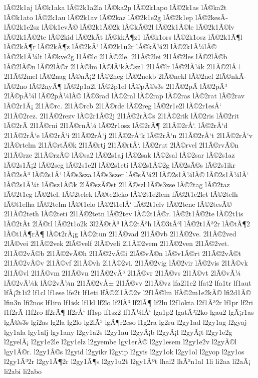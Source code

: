 {lÃ©2k1aj
lÃ©k1aka
lÃ©2k1a2la
lÃ©ka2p
lÃ©2k1apo
lÃ©2k1as
lÃ©ka2t
lÃ©k1ato
lÃ©2k1au
lÃ©2k1av
lÃ©2kaz
lÃ©2k1e2g
lÃ©2k1ep
lÃ©2kesÃ­
lÃ©2k1e2sz
lÃ©k1evÃ©
lÃ©2k1Ã©2k
lÃ©kÃ©2l
lÃ©2k1Ã©le
lÃ©2k1Ã©lv
lÃ©2k1Ã©2te
lÃ©2kid
lÃ©2kÃ­t
lÃ©kkÃ¶z1
lÃ©k1ors
lÃ©2k1osz
lÃ©2k1Ã¶l
lÃ©2kÃ¶r
lÃ©2kÃ¶z
lÃ©2kÅ‘
lÃ©2k1u2r
lÃ©kÃ¼2l
lÃ©2k1Ã¼lÃ©
lÃ©2k1Ã¼lt
lÃ©kve2g
l1Ã©lc
2l1Ã©2le.
2l1Ã©2lei
2l1Ã©2les
lÃ©2lÃ©b
lÃ©2lÃ©n
lÃ©2lÃ©r
2l1Ã©lm
lÃ©lÅ‘kÃ©sz1
2l1Ã©lr
lÃ©2lÃ¼k
2l1Ã©2lÅ±
2l1Ã©2mel
lÃ©2nag
lÃ©nÃ¡2
lÃ©2neg
lÃ©2nekb
2lÃ©nekl
lÃ©2nel
2lÃ©nkÃ­
lÃ©2no
lÃ©2nyÃ¶
lÃ©2p1a2l
lÃ©2p1el
lÃ©pÃ©s3s
2l1Ã©2pÃ­
lÃ©2pÃ³
2lÃ©pÃ¼l
lÃ©2pÃ¼lÃ©
lÃ©3rad
lÃ©2ral
lÃ©2rap
lÃ©2ras
lÃ©2rat
lÃ©2rav
lÃ©2r1Ã¡
2l1Ã©rc.
2l1Ã©rcb
2l1Ã©rde
lÃ©2reg
lÃ©2r1e2l
lÃ©2r1esÅ‘
2l1Ã©2rez.
2l1Ã©2rezv
lÃ©2r1Ã©2j
2l1Ã©2rÃ©s
2l1Ã©2rik
lÃ©2ris
lÃ©2rit
lÃ©2rÃ­
2l1Ã©rni
2l1Ã©rnÃ¼
lÃ©2r1osz
lÃ©2rÃ¶
2l1Ã©2rÅ‘.
lÃ©2rÅ‘d
2l1Ã©2rÅ‘e
lÃ©2rÅ‘i
2l1Ã©2rÅ‘j
2l1Ã©2rÅ‘k
lÃ©2rÅ‘n
2l1Ã©2rÅ‘t
2l1Ã©2rÅ‘v
2lÃ©rtelm
2l1Ã©rtÃ©k
2l1Ã©rtj
2l1Ã©rtÅ‘.
lÃ©2rut
2lÃ©rvel
2l1Ã©rvÃ©n
2l1Ã©rze
2l1Ã©rzÃ©
lÃ©sa2
lÃ©2s1aj
lÃ©2sak
lÃ©2sal
lÃ©2sar
lÃ©2s1az
lÃ©2s1Ã¡2
lÃ©2seg
lÃ©2s1e2l
lÃ©2s1eti
lÃ©2s1Ã©2g
lÃ©2sÃ©s
lÃ©2s1ikr
lÃ©2sÃ³
lÃ©2s1Å‘
lÃ©s3sza
lÃ©s3szer
lÃ©sÃ¼2l
lÃ©2s1Ã¼lÃ©
lÃ©2s1Ã¼lÅ‘
lÃ©2s1Ã¼t
lÃ©sz1Ã©k
2lÃ©szÃ©st
2l1Ã©szl
lÃ©s3zse
lÃ©2tag
lÃ©2taz
lÃ©2t1eg
lÃ©2tel.
lÃ©2telek
lÃ©te2leko
lÃ©2t1e2lem
lÃ©2t1e2let
lÃ©2telh
lÃ©t1elha
lÃ©2telm
lÃ©t1elo
lÃ©2t1elÅ‘
lÃ©2t1elv
lÃ©2tene
lÃ©2tesÃ©
2l1Ã©2teth
lÃ©2teti
2l1Ã©2tetn
lÃ©2tev
lÃ©2t1Ã©r.
lÃ©2t1Ã©2te
lÃ©2t1is
lÃ©2tÃ­t
2lÃ©tl
lÃ©2t1o2k
3l2Ã©tÃ³
lÃ©2tÃ³h
lÃ©3tÃ³l
lÃ©2t1Ã³2r
lÃ©tÃ¶2
lÃ©t1Ã¶rÃ¶
lÃ©t2rÃ¡g
lÃ©2tun
2l1Ã©vad
2l1Ã©vb
2l1Ã©2ve.
2l1Ã©2ved
2lÃ©vei
2l1Ã©2vek
2lÃ©velf
2lÃ©veli
2l1Ã©2vem
2l1Ã©2ven
2l1Ã©2vet.
2l1Ã©2vÃ©b
2l1Ã©2vÃ©h
2l1Ã©2vÃ©i
2lÃ©vÃ©n
lÃ©v1Ã©rt
2l1Ã©2vÃ©t
2l1Ã©2vÃ©v
2l1Ã©vf
2l1Ã©vh
2l1Ã©2vi.
2l1Ã©2vig
lÃ©2vir
lÃ©2vis
2l1Ã©vk
2l1Ã©vl
2l1Ã©vm
2l1Ã©vn
2l1Ã©2vÃ³
2l1Ã©vr
2l1Ã©vs
2l1Ã©vt
2lÃ©vÃ¼
lÃ©2vÃ¼k
lÃ©2vÃ¼n
2l1Ã©2vÅ±
2l1Ã©vv
2l1Ã©vz
lfa2l1e2
lfat2
lfa1tr
lf1aut
lfÃ¡2t1i2
lf1cl
lf1ese
lfe2t
lf1eti
lfÃ©2l1Ã©2v
l2f1Ã©lm
lfÃ©2m1e2kÃ©
lfi2d1Ã©
lfin3n
lfi2nos
lf1iro
lf1isk
lf1kl
lf2lo
lf2lÃ³
lf2lÃ¶
lf2lu
l2f1okta
l2f1Ã³2r
lf1pr
lf2ri
l1f2rÃ­
l1f2ro
lf2rÃ¶
lf2rÅ‘
lf1sp
lf1sz2
lf1Ã¼lÅ‘
lga1p2
lgatÃ³i2ko
lgau2
lgÃ¡r1as
lgÃ©s3s
lgi2as
lg2la
lg2lo
lg2lÃ³
lgÃ¶r2cso
l1g2ra
lg2ru
l2gy1ad
l2gy1ag
l2gyaj
lgy1ala
lgy1alj
lgy1any
l2gy1a2s
l2gy1au
l2gyÃ¡b
l2gyÃ¡l
l2gyÃ¡t
l2gy1e2g
l2gyelÃ¡
l2gy1e2le
l2gy1elz
l2gyembe
lgy1erÃ©
l2gy1esem
l2gy1e2v
l2gyÃ©l
lgy1Ã©r.
l2gy1Ã©s
l2gyid
l2gyikr
l2gyip
l2gyis
l2gy1ok
l2gy1ol
l2gyop
l2gy1os
l2gy1Ã³2r
l2gy1Ã¶2r
l2gy1Ã¶s
l2gy1u2t
l2gy1Ãºt
lhai2
lhÃ³n1al
1li
li2aa
li2aÃ¡
li2abi
li2abo
}
